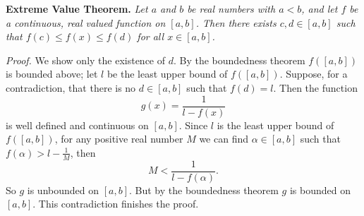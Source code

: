\documentclass[12pt]{article}
\begin{document}
{\bf Extreme Value Theorem. }
{\it
Let $a$ and $b$ be real numbers with $a<b$, and let $f$ be a continuous, real valued function on $[a,b]$. Then there exists $c,d\in[a,b]$ such that $f(c)\leq f(x) \leq f(d)$ for all $x\in[a,b]$.
}

{\it Proof. }
We show only the existence of $d$. By the boundedness theorem $f([a,b])$ is bounded above; let $l$ be the least upper bound of $f([a,b])$. Suppose, for a contradiction, that there is no $d\in[a,b]$ such that $f(d)=l$. Then the function $$ g(x) = \frac{1}{l-f(x)} $$
is well defined and continuous on $[a,b]$. Since $l$ is the least upper bound of $f([a,b])$, for any positive real number $M$ we can find $\alpha\in[a,b]$ such that $f(\alpha)>l-\frac{1}{M}$, then
$$ M < \frac{1}{l-f(\alpha)} \textrm{.}$$
So $g$ is unbounded on $[a,b]$. But by the boundedness theorem $g$ is bounded on $[a,b]$. This contradiction finishes the proof.
\end{document}
